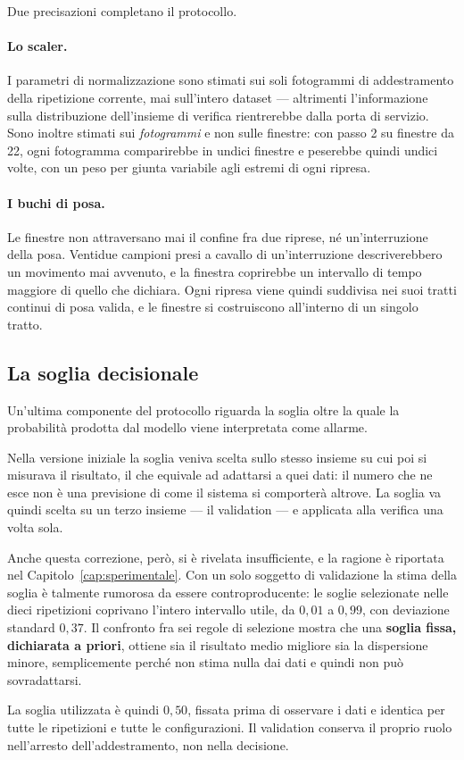 Due precisazioni completano il protocollo.

\paragraph{Lo scaler.} I parametri di normalizzazione sono stimati sui soli
fotogrammi di addestramento della ripetizione corrente, mai sull'intero
dataset — altrimenti l'informazione sulla distribuzione dell'insieme di verifica
rientrerebbe dalla porta di servizio. Sono inoltre stimati sui
\emph{fotogrammi} e non sulle finestre: con passo 2 su finestre da 22, ogni
fotogramma comparirebbe in undici finestre e peserebbe quindi undici volte, con
un peso per giunta variabile agli estremi di ogni ripresa.

\paragraph{I buchi di posa.} Le finestre non attraversano mai il confine fra due
riprese, né un'interruzione della posa. Ventidue campioni presi a cavallo di
un'interruzione descriverebbero un movimento mai avvenuto, e la finestra
coprirebbe un intervallo di tempo maggiore di quello che dichiara. Ogni ripresa
viene quindi suddivisa nei suoi tratti continui di posa valida, e le finestre si
costruiscono all'interno di un singolo tratto.

\subsection{La soglia decisionale}

Un'ultima componente del protocollo riguarda la soglia oltre la quale la
probabilità prodotta dal modello viene interpretata come allarme.

Nella versione iniziale la soglia veniva scelta sullo stesso insieme su cui poi
si misurava il risultato, il che equivale ad adattarsi a quei dati: il numero
che ne esce non è una previsione di come il sistema si comporterà altrove. La
soglia va quindi scelta su un terzo insieme — il validation — e applicata alla
verifica una volta sola.

Anche questa correzione, però, si è rivelata insufficiente, e la ragione è
riportata nel Capitolo~\ref{cap:sperimentale}. Con un solo soggetto di
validazione la stima della soglia è talmente rumorosa da essere
controproducente: le soglie selezionate nelle dieci ripetizioni coprivano
l'intero intervallo utile, da $0{,}01$ a $0{,}99$, con deviazione standard
$0{,}37$. Il confronto fra sei regole di selezione mostra che una \textbf{soglia
fissa, dichiarata a priori}, ottiene sia il risultato medio migliore sia la
dispersione minore, semplicemente perché non stima nulla dai dati e quindi non
può sovradattarsi.

La soglia utilizzata è quindi $0{,}50$, fissata prima di osservare i dati e
identica per tutte le ripetizioni e tutte le configurazioni. Il validation
conserva il proprio ruolo nell'arresto dell'addestramento, non nella decisione.
